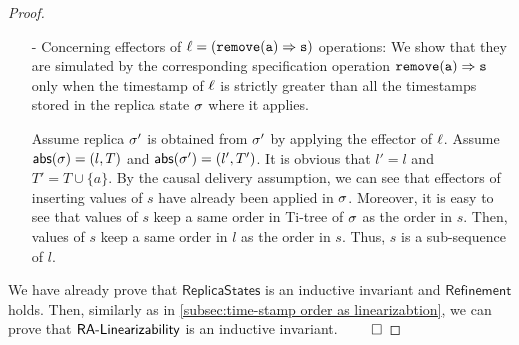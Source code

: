 \begin {proof}
\begin{itemize}
\item[-] Concerning effectors of $\alabel = (\alabellong[{\tt remove}]{a}{s}{})$ operations: We show that they are simulated by the corresponding specification operation $\alabellong[{\tt remove}]{a}{s}{}$ only when the timestamp of $\ell$ is strictly greater than all the timestamps stored in the replica state $\sigma$ where it applies.

    Assume replica $\sigma'$ is obtained from $\sigma'$ by applying the effector of $\ell$. Assume $\mathsf{abs}(\sigma) = (l,T)$ and $\mathsf{abs}(\sigma') = (l',T')$. It is obvious that $l' = l$ and $T' = T \cup \{ a \}$. By the causal delivery assumption, we can see that effectors of inserting values of $s$ have already been applied in $\sigma$. Moreover, it is easy to see that values of $s$ keep a same order in Ti-tree of $\sigma$ as the order in $s$. Then, values of $s$ keep a same order in $l$ as the order in $s$. Thus, $s$ is a sub-sequence of $l$.
\end{itemize}

We have already prove that $\mathsf{ReplicaStates}$ is an inductive invariant and $\mathsf{Refinement}$ holds. Then, similarly as in \sectionautorefname \ref{subsec:time-stamp order as linearizabtion}, we can prove that $\mathsf{RA\text{-}Linearizability{}}$ is an inductive invariant. $\qed$
\end {proof}

















